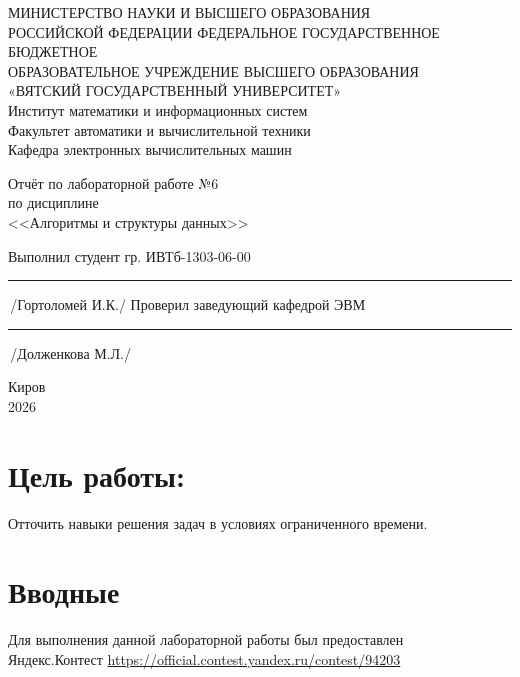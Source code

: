 \documentclass[oneside,a4paper,14pt]{extarticle} %
\begin{document}
	\newpage\thispagestyle{empty}
	\begin{center}
		МИНИСТЕРСТВО НАУКИ И ВЫСШЕГО ОБРАЗОВАНИЯ\\
			РОССИЙСКОЙ ФЕДЕРАЦИИ
			ФЕДЕРАЛЬНОЕ ГОСУДАРСТВЕННОЕ БЮДЖЕТНОЕ\\
			ОБРАЗОВАТЕЛЬНОЕ
			УЧРЕЖДЕНИЕ ВЫСШЕГО ОБРАЗОВАНИЯ\\
			«ВЯТСКИЙ ГОСУДАРСТВЕННЫЙ УНИВЕРСИТЕТ»\\
			Институт математики и информационных систем\\
			Факультет автоматики и вычислительной техники\\
			Кафедра электронных вычислительных машин
	\end{center}
	\vspace{20mm}

	\begin{center}
		Отчёт по лабораторной работе №6\\
		по дисциплине\\
		<<Алгоритмы и структуры данных>>\\
	\end{center}
	\vspace{48mm}

	\noindent
	Выполнил студент гр. ИВТб-1303-06-00 \hfill \rule[-0,5mm]{30mm}{0.15mm}\,/Гортоломей И.К./
	\newline
	Проверил заведующий кафедрой ЭВМ \hfill \rule[-0,5mm]{30mm}{0.15mm}\,/Долженкова М.Л./

	\vfill
	\begin{center}
		Киров\\
		2026
	\end{center}

	\newpage

	\section*{Цель работы:}
	Отточить навыки решения задач в условиях ограниченного времени.

  \section*{Вводные}
  Для выполнения данной лабораторной работы был предоставлен \\ Яндекс.Контест
  \url{https://official.contest.yandex.ru/contest/94203}
\end{document}
